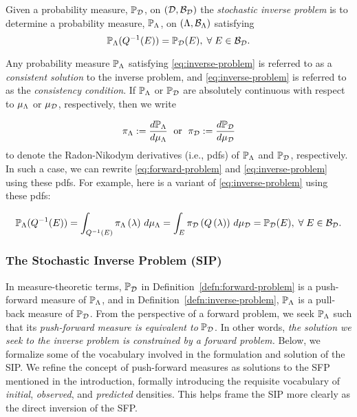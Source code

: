 \begin{defn}\label{defn:inverse-problem}
  Given a probability measure, $\mathbb{P}_{\mathcal{D}}$, on $(\mathcal{D}, \mathcal{B}_{\mathcal{D}})$ the \emph{stochastic inverse problem} is to determine a probability measure, $\mathbb{P}_{\Lambda}$, on $({\Lambda}, \mathcal{B}_{{\Lambda}})$ satisfying
  \begin{equation}\label{eq:inverse-problem}
    \mathbb{P}_{\Lambda} (Q^{-1}(E)) = \mathbb{P}_{\mathcal{D}}(E), \; \forall \; E \in \mathcal{B}_{\mathcal{D}}.
  \end{equation}

  \noindent Any probability measure $\mathbb{P}_{\Lambda}$ satisfying \eqref{eq:inverse-problem} is referred to as a \emph{consistent solution} to the inverse problem, and \eqref{eq:inverse-problem} is referred to as the \emph{consistency condition}.
  If $\mathbb{P}_{\Lambda}$ or $\mathbb{P}_{\mathcal{D}}$ are absolutely continuous with respect to $\mu_{{\Lambda}}$ or $\mu_{\mathcal{D}}$, respectively, then we write

  \begin{equation*}
    \pi_{\Lambda} := \frac{d\mathbb{P}_{\Lambda}}{d\mu_{{\Lambda}}} \;\text{ or }\; \pi_{\mathcal{D}} := \frac{d\mathbb{P}_{\mathcal{D}}}{d\mu_{\mathcal{D}}}
  \end{equation*}
  to denote the Radon-Nikodym derivatives (i.e., pdfs) of $\mathbb{P}_{\Lambda}$ and $\mathbb{P}_{\mathcal{D}}$, respectively.
  In such a case, we can rewrite \eqref{eq:forward-problem} and \eqref{eq:inverse-problem} using these pdfs. For example, here is a variant of \eqref{eq:inverse-problem} using these pdfs:

  \begin{equation*}
  \mathbb{P}_{\Lambda} (Q^{-1}(E)) = \int_{Q^{-1}(E)} \pi_{\Lambda} \left ( \lambda \right ) \, d\mu_{{\Lambda}} = \int_E \pi_{\mathcal{D}} \left ( Q\left ( \lambda \right ) \right ) \, d\mu_{\mathcal{D}} = \mathbb{P}_{\mathcal{D}}(E), \; \forall \; E \in \mathcal{B}_{\mathcal{D}}.
  \end{equation*}
\end{defn}

\subsubsection{The Stochastic Inverse Problem (SIP)}

In measure-theoretic terms, $\mathbb{P}_{\mathcal{D}}$ in Definition~\ref{defn:forward-problem} is a push-forward measure of $\mathbb{P}_{\Lambda}$, and in Definition~\ref{defn:inverse-problem}, $\mathbb{P}_{\Lambda}$ is a pull-back measure of $\mathbb{P}_{\mathcal{D}}$.
From the perspective of a forward problem, we seek $\mathbb{P}_{\Lambda}$ such that its \emph{push-forward measure is equivalent to} $\mathbb{P}_{\mathcal{D}}$.
In other words, \emph{the solution we seek to the inverse problem is constrained by a forward problem.}
Below, we formalize some of the vocabulary involved in the formulation and solution of the SIP.
We refine the concept of push-forward measures as solutions to the SFP mentioned in the introduction, formally introducing the requisite vocabulary of \emph{initial}, \emph{observed}, and \emph{predicted} densities.
This helps frame the SIP more clearly as the direct inversion of the SFP.

